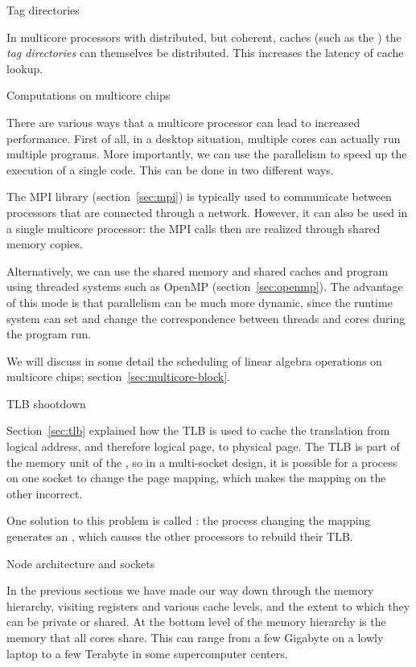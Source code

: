  {Tag directories}

In multicore processors with distributed, but coherent, caches
(such as the )
the
%
\emph{tag directories}
can themselves be distributed. This increases the latency of cache lookup.


 {Computations on multicore chips}

There are various ways that a multicore processor can lead to
increased performance. First of all, in a desktop situation, multiple
cores can actually run multiple programs. More importantly, we can use
the parallelism to speed up the execution of a single code. This can
be done in two different ways.

The MPI library (section~\ref{sec:mpi}) is typically used to
communicate between processors that are connected through a
network. However, it can also be used in a single multicore processor:
the MPI calls then are realized through shared memory copies.

Alternatively, we can use the shared memory and shared caches and
program using threaded systems such as OpenMP
(section~\ref{sec:openmp}). The advantage of this mode is that
parallelism can be much more dynamic, since the runtime system can set
and change
the correspondence between threads and cores during the program run.

We will discuss in some detail the
scheduling of linear algebra operations on multicore chips;
section~\ref{sec:multicore-block}.

 {TLB shootdown}

Section~\ref{sec:tlb} explained how the \ac{TLB} is used to cache
the translation from logical address, and therefore logical page, to
physical page. The TLB is part of the memory unit of the , so in
a multi-socket design, it is possible for a process on one socket to
change the page mapping, which makes the mapping on the other
incorrect.

One solution to this problem is called :
the process changing the mapping generates an
, which causes the other
processors to rebuild their TLB.


 {Node architecture and sockets}
\label{sec:socket}

In the previous sections we have made our way down through the memory
hierarchy, visiting registers and various cache levels, and the extent
to which they can be private or shared. At the bottom level of the
memory hierarchy is the memory that all cores share. This can range
from a few Gigabyte on a lowly laptop to a few Terabyte in some
supercomputer centers. 

